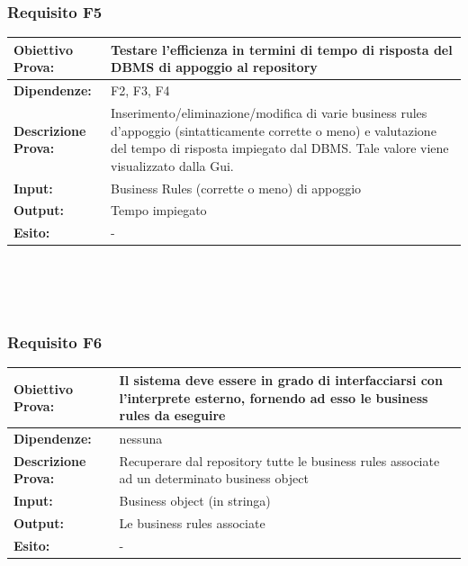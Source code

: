 \documentclass[11pt,titlepage,a4paper]{report}
\begin{document}
\subsubsection{Requisito F5}
\begin{tabular}{||p{4.5cm}||p{7.5cm}||}
\hline
{\textbf {Obiettivo Prova:}}& Testare l'efficienza in termini di tempo di risposta del DBMS di appoggio al repository \\ \hline
{\textbf{Dipendenze:}}& F2, F3, F4\\ \hline
{\textbf{Descrizione Prova:}}& Inserimento/eliminazione/modifica di varie business rules d'appoggio (sintatticamente corrette o meno) e valutazione del tempo di risposta impiegato dal DBMS. Tale valore viene visualizzato dalla Gui. \\ \hline
{\textbf{Input:}}& Business Rules (corrette o meno) di appoggio  \\ \hline
{\textbf{Output:}}& Tempo impiegato \\ \hline
{\textbf{Esito:}}& - \\ \hline
\end{tabular} \\
\\
\\
\subsubsection{Requisito F6}
\begin{tabular}{||p{4.5cm}||p{7.5cm}||}
\hline
{\textbf {Obiettivo Prova:}}& Il sistema deve essere in grado di interfacciarsi con l'interprete esterno, fornendo ad esso le business rules da eseguire \\ \hline
{\textbf{Dipendenze:}}& nessuna \\ \hline
{\textbf{Descrizione Prova:}}&  Recuperare dal repository tutte le business rules associate ad un determinato business object\\ \hline
{\textbf{Input:}}&  Business object (in stringa) \\ \hline
{\textbf{Output:}}& Le business rules associate\\ \hline
{\textbf{Esito:}}& - \\ \hline
\end{tabular} \\
\\
\\
\end{document}
